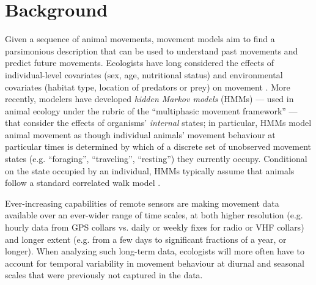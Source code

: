 \documentclass{bmcart}
\begin{document}


\section*{Background}

Given a sequence of animal movements, movement models aim to find a parsimonious description
that can be used to understand past movements and predict
future movements. Ecologists have long considered the effects of
individual-level covariates (sex, age, nutritional status) and
environmental covariates (habitat type, location of predators or prey)
on movement \cite{patterson2008state, mckenzie2009first, pal1998dispersal}. 
More recently, modelers have developed
\emph{hidden Markov models} (HMMs)
\cite{firle_influence_1998,nathan_movement_2008,langrock_flexible_2012} %
--- used in animal ecology under the rubric of the ``multiphasic movement
framework'' \cite{fryxell_multiple_2008} --- that consider the effects
of organisms' \emph{internal} states; in particular, HMMs model animal
movement as though individual animals' movement behaviour 
at particular times is determined
by which of a discrete set of unobserved movement states
(e.g. ``foraging'', ``traveling'', ``resting'') they currently occupy.
Conditional on the state occupied by an individual, HMMs typically
assume that animals follow a standard correlated walk model
\cite{okubo_diffusion_1980,turchin1998quantitative}.


Ever-increasing capabilities of remote
sensors are making movement data available over an
ever-wider range of time scales, at both higher resolution (e.g. hourly data
from GPS collars vs. daily or weekly fixes for radio or VHF
collars) and longer extent (e.g. from a few days to significant
fractions of a year, or longer).  When analyzing such
long-term data, ecologists will more
often have to account for temporal variability in movement
behaviour at diurnal and seasonal scales that were previously
not captured in the data.
\end{document}
